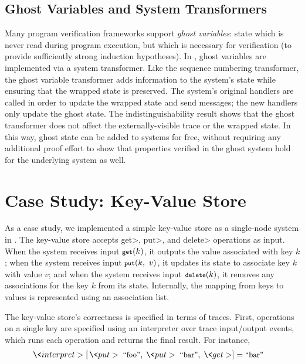 \subsection{Ghost Variables and System Transformers}

Many program verification frameworks support
\textit{ghost variables}: state which is never read during
program execution, but which is necessary for verification (\eg to
provide sufficiently strong induction hypotheses). In \Verdi, ghost
variables are implemented via a system transformer. Like the sequence
numbering transformer, the ghost variable transformer adds information
to the system's state while ensuring that the wrapped state is
preserved. The system's original handlers are called in order to
update the wrapped state and send messages; the new handlers only
update the ghost state. The indistinguishability result shows that the
ghost transformer does not affect the externally-visible trace or the
wrapped state. In this way, ghost state can be added to \Verdi systems
for free, without requiring any additional proof effort to show
that properties verified in the ghost system hold for the underlying
system as well.

\section{Case Study: Key-Value Store}\label{sec:verdi:casestudy-kvstore}

\newcommand{\getk}{\<get>\xspace}
\newcommand{\putk}{\<put>\xspace}
\newcommand{\delk}{\<delete>\xspace}

As a case study, we implemented a simple key-value store as a single-node
system in \Verdi. The key-value store accepts \getk, \putk, and \delk
operations as input.  When the system receives input $\getk(k)$, it outputs
the value associated with key $k$; when the system receives input $\putk(k,\ v)$, it
updates its state to associate key $k$ with value $v$; and when the system
receives input $\delk(k)$, it removes any associations for the key $k$ from its
state.  Internally, the mapping from keys to values is represented using an
association list.

The key-value store's correctness is specified in terms of traces. First,
operations on a single key are specified using an interpreter over trace
input/output events, which
runs each operation and returns the final result.  For instance,
\begin{align*}
  \<interpret>&\;[ \,\putk \; \mbox{\small{\text{``foo''}}}
  , \; \putk \; \mbox{\small{\text{``bar''}}}  , \; \getk  ] = \mbox{\small\text{``bar''}}
\end{align*}

